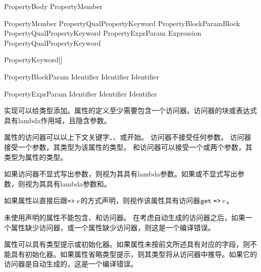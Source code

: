 \begin{bnf}{PropertyBody}
    \terminal{\{} PropertyMember\bnfp \terminal{\}}
\end{bnf}

\begin{bnf}{PropertyMember}
    PropertyQual\bnfs PropertyKeyword PropertyBlockParam\bnfq Block \br
    PropertyQual\bnfs PropertyKeyword PropertyExprParam\bnfq \terminal{=>} Expression \terminal{;} \br
    PropertyQual\bnfs PropertyKeyword \terminal{;}
\end{bnf}

\begin{bnf}{PropertyKeyword}[\oneof]
\end{bnf}

\begin{bnf}{PropertyBlockParam}
    Identifier \br
    Identifier \terminal{,} Identifier
\end{bnf}

\begin{bnf}{PropertyExprParam}
    Identifier \br
    \terminal{(} Identifier \terminal{,} Identifier \terminal{)}
\end{bnf}

\pnum
实现可以给类型添加。属性的定义至少需要包含一个访问器。访问器的块或表达式具有lambda作用域，且隐含参数。

\pnum
属性的访问器可以以上下文关键字、、或开始。
访问器不接受任何参数。
访问器接受一个参数，其类型为该属性的类型。
和访问器可以接受一个或两个参数，其类型为属性的类型。

\pnum
如果访问器不显式写出参数，则视为其具有lambda参数。如果或不显式写出参数，则视为其具有lambda参数和。

\pnum
如果属性以直接后跟$\mathrel{\texttt{=>}}e$的方式声明，则视作该属性具有访问器$\texttt{get} \mathrel{\texttt{=>}} e$。

\pnum
未使用声明的属性不能包含、和访问器。
在考虑自动生成的访问器之后，如果一个属性缺少访问器，或一个属性缺少访问器，则这是一个编译错误。

\pnum
属性可以具有类型提示或初始化器。如果属性未按前文所述具有对应的字段，则不能具有初始化器。如果属性省略类型提示，则其类型将从访问器中推导。如果它的访问器是自动生成的，这是一个编译错误。

